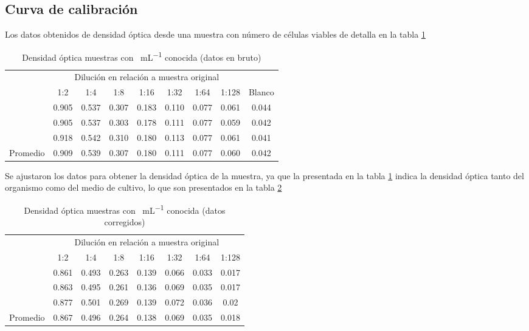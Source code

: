 \subsection{Curva de calibración}

Los datos obtenidos de densidad óptica desde una muestra con número de células viables de detalla en la tabla \ref{tab:cal_brut}

\begin{table}[H]
  \centering
  \begin{tabular}{ccccccccc}\toprule
    & \multicolumn{7}{c}{Dilución en relación a muestra original} & \\ \cmidrule{2-8}
    & 1:2 & 1:4 & 1:8 & 1:16 & 1:32 & 1:64 & 1:128 & Blanco \\ \cmidrule{2-9}
    & 0.905 & 0.537 & 0.307 & 0.183 & 0.110 & 0.077 & 0.061 & 0.044 \\
    & 0.905 & 0.537 & 0.303 & 0.178 & 0.111 & 0.077 & 0.059 & 0.042 \\
    & 0.918 & 0.542 & 0.310 & 0.180 & 0.113 & 0.077 & 0.061 & 0.041 \\ \midrule
    Promedio & 0.909 & 0.539 & 0.307 & 0.180 & 0.111 & 0.077 & 0.060 & 0.042 \\ \bottomrule
  \end{tabular}
  \caption{Densidad óptica muestras con \si{\ufc\per\mL} conocida (datos en bruto)}
  \label{tab:cal_brut}
\end{table}


Se ajustaron los datos para obtener la densidad óptica de la muestra, ya que la presentada en la tabla \ref{tab:cal_brut} indica la densidad óptica tanto del organismo como del medio de cultivo, lo que son presentados en la tabla \ref{tab:cal_adj}

\begin{table}[H]
  \centering
  \begin{tabular}{cccccccc}\toprule
    & \multicolumn{7}{c}{Dilución en relación a muestra original} \\ \cmidrule{2-8}
    & 1:2 & 1:4 & 1:8 & 1:16 & 1:32 & 1:64 & 1:128 \\ \cmidrule{2-8}
    & 0.861 & 0.493 & 0.263 & 0.139 & 0.066 & 0.033 & 0.017 \\
    & 0.863 & 0.495 & 0.261 & 0.136 & 0.069 & 0.035 & 0.017 \\
    & 0.877 & 0.501 & 0.269 & 0.139 & 0.072 & 0.036 & 0.02 \\ \midrule
    Promedio & 0.867 & 0.496 & 0.264 & 0.138 & 0.069 & 0.035 & 0.018 \\ \bottomrule
  \end{tabular}
  \caption{Densidad óptica muestras con \si{\ufc\per\mL} conocida (datos corregidos)}
  \label{tab:cal_adj}
\end{table}

